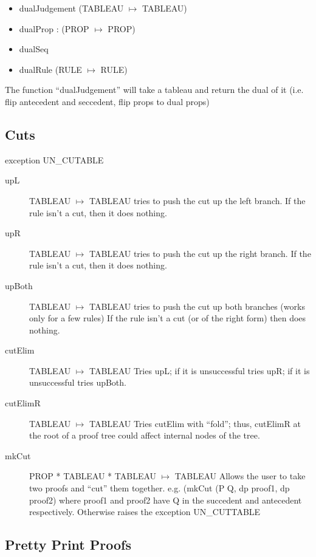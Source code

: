 \documentclass[12pt]{article}
\begin{document}
\begin{itemize}
\item dualJudgement (TABLEAU $\mapsto$ TABLEAU)
\item dualProp : (PROP $\mapsto$ PROP)
\item dualSeq 
\item dualRule	(RULE $\mapsto$ RULE)
\end{itemize}

The function ``dualJudgement'' will take a tableau and return the
dual of it (i.e. flip antecedent and seccedent, flip props to dual props)


\subsection{Cuts}
exception UN\_CUTABLE

\begin{description}
\item[upL]  TABLEAU $\mapsto$  TABLEAU
	tries to push the cut up the left branch.  If the rule isn't a
	cut, then it does nothing.

\item[upR]  TABLEAU $\mapsto$  TABLEAU
	tries to push the cut up the right branch.  If the rule isn't a
	cut, then it does nothing.

\item[upBoth]  TABLEAU $\mapsto$  TABLEAU
	tries to push the cut up both branches (works only for a few rules)
	If the rule isn't a cut (or of the right form) then does nothing.

\item[cutElim]  TABLEAU $\mapsto$  TABLEAU
	Tries upL; if it is unsuccessful tries upR; if it is unsuccessful 
	tries upBoth.
\item[cutElimR]  TABLEAU $\mapsto$  TABLEAU
	Tries cutElim with ``fold''; thus, cutElimR at the root of a proof
	tree could affect internal nodes of the tree.  
\item[mkCut] PROP *  TABLEAU * TABLEAU $\mapsto$ TABLEAU
	Allows the user to take two proofs and ``cut'' them together.
	e.g. (mkCut (P Q, dp proof1, dp proof2)
	where proof1 and proof2 have Q in the succedent and antecedent
	respectively.  Otherwise raises the exception UN\_CUTTABLE
\end{description}


\subsection{Pretty Print Proofs}
\end{document}
